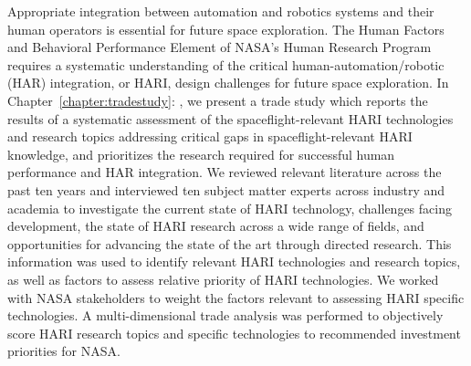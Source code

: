 Appropriate integration between automation and robotics systems and their human operators is essential for future space exploration.
The Human Factors and Behavioral Performance Element of NASA's Human Research Program requires a systematic understanding of the critical human-automation/robotic (HAR) integration, or HARI, design challenges for future space exploration.
In Chapter~\ref{chapter:tradestudy}: , we present a trade study which reports the results of a systematic assessment of the spaceflight-relevant HARI technologies and research topics addressing critical gaps in spaceflight-relevant HARI knowledge, and prioritizes the research required for successful human performance and HAR integration.
We reviewed relevant literature across the past ten years and interviewed ten subject matter experts across industry and academia to investigate the current state of HARI technology, challenges facing development, the state of HARI research across a wide range of fields, and opportunities for advancing the state of the art through directed research.
This information was used to identify relevant HARI technologies and research topics, as well as factors to assess relative priority of HARI technologies.
We worked with NASA stakeholders to weight the factors relevant to assessing HARI specific technologies.
A multi-dimensional trade analysis was performed to objectively score HARI research topics and specific technologies to recommended investment priorities for NASA.

